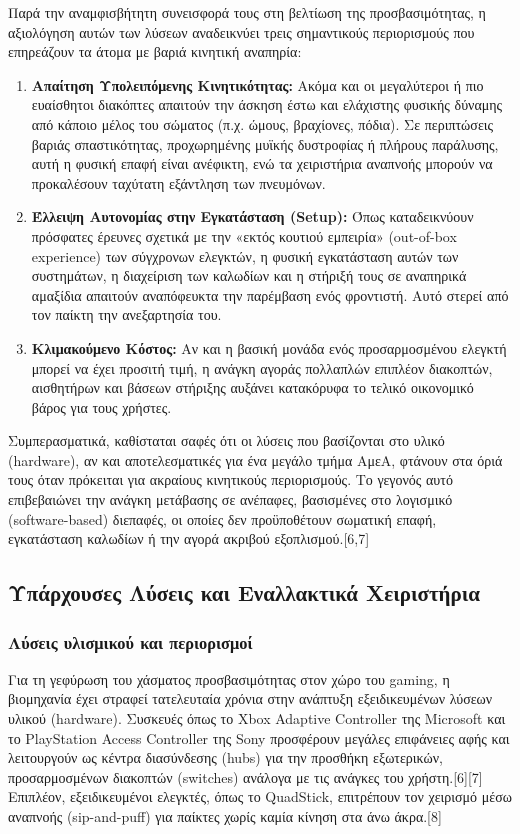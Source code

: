 \documentclass[twoside, a4paper, 11pt]{article}
\begin{document}
Παρά την αναμφισβήτητη συνεισφορά τους στη βελτίωση της προσβασιμότητας, η αξιολόγηση αυτών των λύσεων αναδεικνύει τρεις σημαντικούς περιορισμούς που επηρεάζουν τα άτομα με βαριά κινητική αναπηρία:
\begin{enumerate}
    \item \textbf{Απαίτηση Υπολειπόμενης Κινητικότητας:} Ακόμα και οι μεγαλύτεροι ή πιο ευαίσθητοι διακόπτες απαιτούν την άσκηση έστω και ελάχιστης φυσικής δύναμης από κάποιο μέλος του σώματος (π.χ. ώμους, βραχίονες, πόδια). Σε περιπτώσεις βαριάς σπαστικότητας, προχωρημένης μυϊκής δυστροφίας ή πλήρους παράλυσης, αυτή η φυσική επαφή είναι ανέφικτη, ενώ τα χειριστήρια αναπνοής μπορούν να προκαλέσουν ταχύτατη εξάντληση των πνευμόνων.
    \item \textbf{Έλλειψη Αυτονομίας στην Εγκατάσταση (Setup):} Όπως καταδεικνύουν πρόσφατες έρευνες σχετικά με την «εκτός κουτιού εμπειρία» (out-of-box experience) των σύγχρονων ελεγκτών, η φυσική εγκατάσταση αυτών των συστημάτων, η διαχείριση των καλωδίων και η στήριξή τους σε αναπηρικά αμαξίδια απαιτούν αναπόφευκτα την παρέμβαση ενός φροντιστή. Αυτό στερεί από τον παίκτη την ανεξαρτησία του.
    \item \textbf{Κλιμακούμενο Κόστος:} Αν και η βασική μονάδα ενός προσαρμοσμένου ελεγκτή μπορεί να έχει προσιτή τιμή, η ανάγκη αγοράς πολλαπλών επιπλέον διακοπτών, αισθητήρων και βάσεων στήριξης αυξάνει κατακόρυφα το τελικό οικονομικό βάρος για τους χρήστες.
\end{enumerate}

Συμπερασματικά, καθίσταται σαφές ότι οι λύσεις που βασίζονται στο υλικό (hardware), αν και αποτελεσματικές για ένα μεγάλο τμήμα ΑμεΑ, φτάνουν στα όριά τους όταν πρόκειται για ακραίους κινητικούς περιορισμούς. Το γεγονός αυτό επιβεβαιώνει την ανάγκη μετάβασης σε ανέπαφες, βασισμένες στο λογισμικό (software-based) διεπαφές, οι οποίες δεν προϋποθέτουν σωματική επαφή, εγκατάσταση καλωδίων ή την αγορά ακριβού εξοπλισμού.[6,7]

\subsection{Υπάρχουσες Λύσεις και Εναλλακτικά Χειριστήρια}
\raggedbottom 
\subsubsection{Λύσεις υλισμικού και περιορισμοί}
Για τη γεφύρωση του χάσματος προσβασιμότητας στον χώρο του gaming, η βιομηχανία έχει στραφεί τατελευταία χρόνια στην ανάπτυξη εξειδικευμένων λύσεων υλικού (hardware). Συσκευές όπως το Xbox Adaptive Controller της Microsoft και το PlayStation Access Controller της Sony προσφέρουν μεγάλες επιφάνειες αφής και λειτουργούν ως κέντρα διασύνδεσης (hubs) για την προσθήκη εξωτερικών, προσαρμοσμένων διακοπτών (switches) ανάλογα με τις ανάγκες του χρήστη.[6][7] Επιπλέον, εξειδικευμένοι ελεγκτές,
όπως το QuadStick, επιτρέπουν τον χειρισμό μέσω αναπνοής (sip-and-puff) για παίκτες χωρίς καμία κίνηση στα άνω άκρα.[8]
\end{document}
